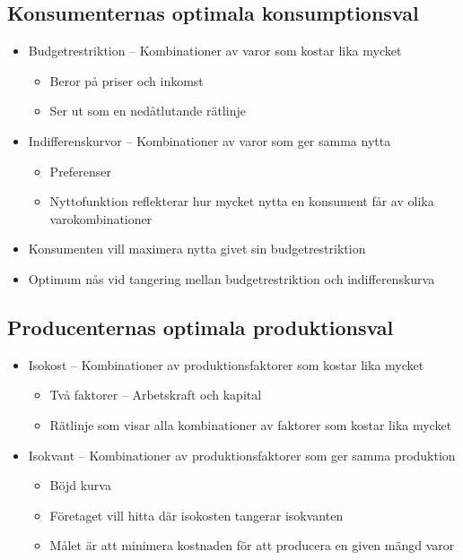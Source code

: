 \documentclass[12pt,a4paper]{article}
\begin{document}
{\subsection*{Konsumenternas optimala konsumptionsval}
\begin{itemize}
    \item Budgetrestriktion -- Kombinationer av varor som kostar lika mycket
    \begin{itemize}
        \item Beror på priser och inkomst
        \item Ser ut som en nedåtlutande rätlinje
    \end{itemize}
    \item Indifferenskurvor -- Kombinationer av varor som ger samma nytta
    \begin{itemize}
        \item Preferenser
        \item Nyttofunktion reflekterar hur mycket nytta en konsument får av olika varokombinationer
    \end{itemize}
    \item Konsumenten vill maximera nytta givet sin budgetrestriktion
    \item Optimum nås vid tangering mellan budgetrestriktion och indifferenskurva
\end{itemize}

\subsection*{Producenternas optimala produktionsval}
\begin{itemize}
    \item Isokost -- Kombinationer av produktionsfaktorer som kostar lika mycket
    \begin{itemize}
        \item Två faktorer -- Arbetskraft och kapital
        \item Rätlinje som visar alla kombinationer av faktorer som kostar lika mycket
    \end{itemize}
    \item Isokvant -- Kombinationer av produktionsfaktorer som ger samma produktion
    \begin{itemize}
        \item Böjd kurva 
        \item Företaget vill hitta där isokosten tangerar isokvanten 
        \item Målet är att minimera kostnaden för att producera en given mängd varor
    \end{itemize}
\end{itemize}

}
\end{document}
